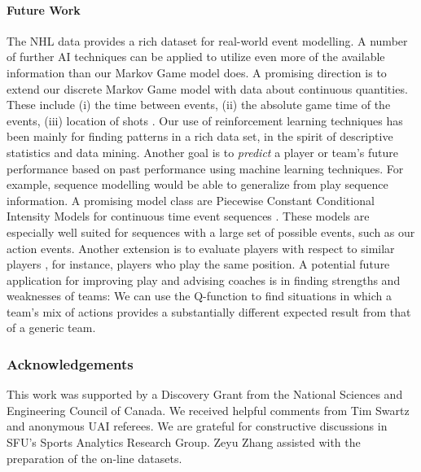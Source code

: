\documentclass[]{article}
\begin{document}
\paragraph{Future Work} The NHL data provides a rich dataset for real-world event modelling. A number of further AI techniques can be applied to utilize even more of the available information than our Markov Game model does. A promising direction is to extend our discrete Markov Game model with data about continuous quantities. These include (i) the time between events, %
(ii) the absolute game time of the events, %
(iii) location of shots \citep{Krzywicki2005}.
%
Our use of reinforcement learning techniques has been mainly for finding patterns in a rich data set, in the spirit of descriptive statistics and data mining. Another goal is to {\em predict} a player or team's future performance based on past performance using machine learning techniques. %
For example, sequence modelling would be able to generalize from play sequence information. A promising model class are Piecewise Constant Conditional Intensity Models for continuous time event sequences \citep{Gunawardana2011,Parikh2012}. These models are especially well suited for sequences with a large set of possible events, such as our action events. Another extension is to evaluate players with respect to similar players \citep{Cervone2014a}, for instance, players who play the same position.
A potential future application for improving play and advising coaches is in finding strengths and weaknesses of teams: We can use the Q-function to find situations in which a team's mix of actions provides a substantially different expected result from that of a generic team.


\subsubsection*{Acknowledgements} This work was supported by a Discovery Grant from the National Sciences and Engineering Council of Canada. We received helpful comments from Tim Swartz and anonymous UAI referees. 
We are grateful for constructive discussions in SFU's Sports Analytics Research Group. 
Zeyu Zhang assisted with the preparation of the on-line datasets.
\end{document}
